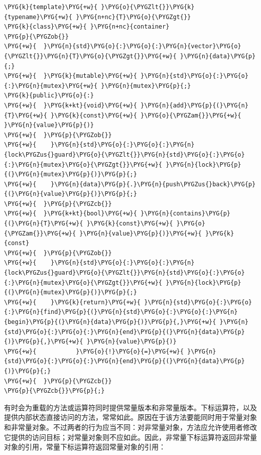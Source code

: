 \begin{codeblockbg}
\begin{Verbatim}[commandchars=\\\{\},breaklines=true,breakanywhere=true,fontsize=\codefont,xleftmargin=17bp]
\PYG{k}{template}\PYG{+w}{ }\PYG{o}{\PYGZlt{}}\PYG{k}{typename}\PYG{+w}{ }\PYG{n+nc}{T}\PYG{o}{\PYGZgt{}}
\PYG{k}{class}\PYG{+w}{ }\PYG{n+nc}{container}
\PYG{p}{\PYGZob{}}
\PYG{+w}{  }\PYG{n}{std}\PYG{o}{:}\PYG{o}{:}\PYG{n}{vector}\PYG{o}{\PYGZlt{}}\PYG{n}{T}\PYG{o}{\PYGZgt{}}\PYG{+w}{ }\PYG{n}{data}\PYG{p}{;}
\PYG{+w}{  }\PYG{k}{mutable}\PYG{+w}{ }\PYG{n}{std}\PYG{o}{:}\PYG{o}{:}\PYG{n}{mutex}\PYG{+w}{ }\PYG{n}{mutex}\PYG{p}{;}
\PYG{k}{public}\PYG{o}{:}
\PYG{+w}{  }\PYG{k+kt}{void}\PYG{+w}{ }\PYG{n}{add}\PYG{p}{(}\PYG{n}{T}\PYG{+w}{ }\PYG{k}{const}\PYG{+w}{ }\PYG{o}{\PYGZam{}}\PYG{+w}{ }\PYG{n}{value}\PYG{p}{)}
\PYG{+w}{  }\PYG{p}{\PYGZob{}}
\PYG{+w}{    }\PYG{n}{std}\PYG{o}{:}\PYG{o}{:}\PYG{n}{lock\PYGZus{}guard}\PYG{o}{\PYGZlt{}}\PYG{n}{std}\PYG{o}{:}\PYG{o}{:}\PYG{n}{mutex}\PYG{o}{\PYGZgt{}}\PYG{+w}{ }\PYG{n}{lock}\PYG{p}{(}\PYG{n}{mutex}\PYG{p}{)}\PYG{p}{;}
\PYG{+w}{    }\PYG{n}{data}\PYG{p}{.}\PYG{n}{push\PYGZus{}back}\PYG{p}{(}\PYG{n}{value}\PYG{p}{)}\PYG{p}{;}
\PYG{+w}{  }\PYG{p}{\PYGZcb{}}
\PYG{+w}{  }\PYG{k+kt}{bool}\PYG{+w}{ }\PYG{n}{contains}\PYG{p}{(}\PYG{n}{T}\PYG{+w}{ }\PYG{k}{const}\PYG{+w}{ }\PYG{o}{\PYGZam{}}\PYG{+w}{ }\PYG{n}{value}\PYG{p}{)}\PYG{+w}{ }\PYG{k}{const}
\PYG{+w}{  }\PYG{p}{\PYGZob{}}
\PYG{+w}{    }\PYG{n}{std}\PYG{o}{:}\PYG{o}{:}\PYG{n}{lock\PYGZus{}guard}\PYG{o}{\PYGZlt{}}\PYG{n}{std}\PYG{o}{:}\PYG{o}{:}\PYG{n}{mutex}\PYG{o}{\PYGZgt{}}\PYG{+w}{ }\PYG{n}{lock}\PYG{p}{(}\PYG{n}{mutex}\PYG{p}{)}\PYG{p}{;}
\PYG{+w}{    }\PYG{k}{return}\PYG{+w}{ }\PYG{n}{std}\PYG{o}{:}\PYG{o}{:}\PYG{n}{find}\PYG{p}{(}\PYG{n}{std}\PYG{o}{:}\PYG{o}{:}\PYG{n}{begin}\PYG{p}{(}\PYG{n}{data}\PYG{p}{)}\PYG{p}{,}\PYG{+w}{ }\PYG{n}{std}\PYG{o}{:}\PYG{o}{:}\PYG{n}{end}\PYG{p}{(}\PYG{n}{data}\PYG{p}{)}\PYG{p}{,}\PYG{+w}{ }\PYG{n}{value}\PYG{p}{)}
\PYG{+w}{           }\PYG{o}{!}\PYG{o}{=}\PYG{+w}{ }\PYG{n}{std}\PYG{o}{:}\PYG{o}{:}\PYG{n}{end}\PYG{p}{(}\PYG{n}{data}\PYG{p}{)}\PYG{p}{;}
\PYG{+w}{  }\PYG{p}{\PYGZcb{}}
\PYG{p}{\PYGZcb{}}\PYG{p}{;}
\end{Verbatim}
\end{codeblockbg}



有时会为重载的方法或运算符同时提供常量版本和非常量版本。下标运算符，以及提供内部状态直接访问的方法，常常如此。原因在于该方法要能同时用于常量对象和非常量对象。不过两者的行为应当不同：对非常量对象，方法应允许使用者修改它提供的访问目标；对常量对象则不应如此。因此，非常量下标运算符返回非常量对象的引用，常量下标运算符返回常量对象的引用：


